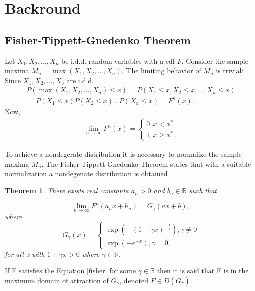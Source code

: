 \documentclass[english,12pt,a4paper,pdftex,sci,utf8]{aaltothesis} %
\newtheorem{theorem}{Theorem}[section]
\begin{document}
\thispagestyle{empty}




\clearpage

\section{Backround}
\label{backround}

\subsection{Fisher-Tippett-Gnedenko Theorem}
\label{domains}

Let $X_1, X_2, ..., X_n$ be i.d.d. random variables with a cdf $F$. Consider the  sample maxima $M_n = \max(X_1, X_2, ..., X_n)$. The limiting behavior of $M_n$ is trivial: Since $X_1, X_2,..., X_3$ are i.d.d.
\begin{gather*}
P(\max(X_1, X_2, ... , X_n) \leq x) = P(X_1 \leq x, X_2 \leq x,..., X_n \leq x) \\ = 
P(X_1 \leq x) P(X_2 \leq x) ... P(X_n \leq x)
=F^n(x).
\end{gather*}
Now,
\begin{gather*}
\lim_{n\to\infty} F^n(x) = 
\begin{cases}
0, x < x^* \\
1, x \geq x^*.
\end{cases}
\end{gather*}



To achieve a nondegerate distribution it is necessary to normalize the sample maxima $M_n$. The Fisher-Tippett-Gnedenko Theorem states that with a suitable normalization a nondegenate distribution is obtained \cite{fisher} \cite{gnedenko}.

\begin{theorem}
There exists real constants $a_n>0$ and $b_n \in \mathbb{R}$ such that 

\begin{equation}
\lim_{n\to\infty} F^n(a_nx + b_n) = G_{\gamma}(ax+b),
\label{fisher}
\end{equation}
where
\begin{equation*}
G_{\gamma}(x)=
\begin{cases}
\exp(-(1 + \gamma x)^{-\frac{1}{\gamma}}), \gamma \neq 0 \\
\exp(-e^{-x}), \gamma = 0,
\end{cases}
\label{mdaEq}
\end{equation*}
for all x with $1+\gamma x > 0$ where $\gamma \in \mathbb{R}$.
\end{theorem}
If F satisfies the Equation \eqref{fisher} for some $\gamma \in \mathbb{R}$ then it is said that F is in the maximum domain of attraction of $G_{\gamma}$, denoted $F \in D(G_{\gamma})$.
\end{document}
